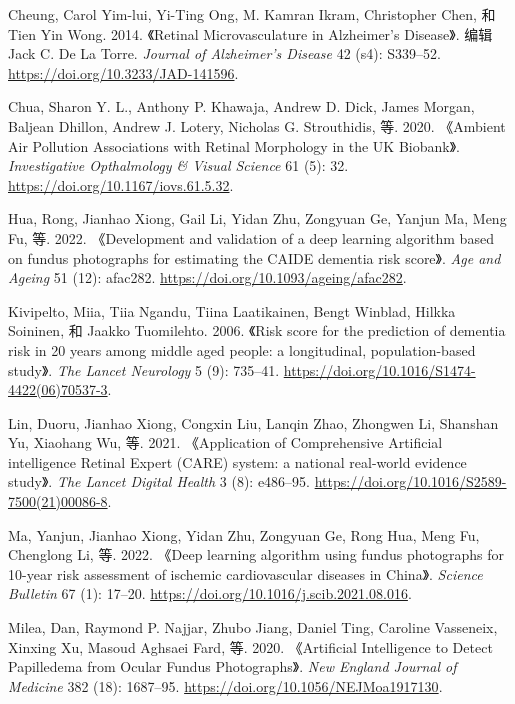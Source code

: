 \documentclass[
  Letterpaper,
]{scrbook}
\newlength{\cslhangindent}
\newenvironment{CSLReferences}[2] %
 {\begin{list}{}{%
  \setlength{\itemindent}{0pt}
  \setlength{\leftmargin}{0pt}
  \setlength{\parsep}{0pt}
  \ifodd #1
   \setlength{\leftmargin}{\cslhangindent}
   \setlength{\itemindent}{-1\cslhangindent}
  \fi
  \setlength{\itemsep}{#2\baselineskip}}}
 {\end{list}}
\begin{document}
\label{refs}
\begin{CSLReferences}{1}{0}
Cheung, Carol Yim-lui, Yi-Ting Ong, M. Kamran Ikram, Christopher Chen,
和 Tien Yin Wong. 2014. {《Retinal {Microvasculature} in {Alzheimer}'s
{Disease}》}. 编辑 Jack C. De La Torre. \emph{Journal of Alzheimer's
Disease} 42 (s4): S339--52. \url{https://doi.org/10.3233/JAD-141596}.

Chua, Sharon Y. L., Anthony P. Khawaja, Andrew D. Dick, James Morgan,
Baljean Dhillon, Andrew J. Lotery, Nicholas G. Strouthidis, 等. 2020.
{《Ambient {Air} {Pollution} {Associations} with {Retinal} {Morphology}
in the {UK} {Biobank}》}. \emph{Investigative Opthalmology \& Visual
Science} 61 (5): 32. \url{https://doi.org/10.1167/iovs.61.5.32}.

Hua, Rong, Jianhao Xiong, Gail Li, Yidan Zhu, Zongyuan Ge, Yanjun Ma,
Meng Fu, 等. 2022. {《Development and validation of a deep learning
algorithm based on fundus photographs for estimating the {CAIDE}
dementia risk score》}. \emph{Age and Ageing} 51 (12): afac282.
\url{https://doi.org/10.1093/ageing/afac282}.

Kivipelto, Miia, Tiia Ngandu, Tiina Laatikainen, Bengt Winblad, Hilkka
Soininen, 和 Jaakko Tuomilehto. 2006. {《Risk score for the prediction
of dementia risk in 20 years among middle aged people: a longitudinal,
population-based study》}. \emph{The Lancet Neurology} 5 (9): 735--41.
\url{https://doi.org/10.1016/S1474-4422(06)70537-3}.

Lin, Duoru, Jianhao Xiong, Congxin Liu, Lanqin Zhao, Zhongwen Li,
Shanshan Yu, Xiaohang Wu, 等. 2021. {《Application of {Comprehensive}
{Artificial} intelligence {Retinal} {Expert} ({CARE}) system: a national
real-world evidence study》}. \emph{The Lancet Digital Health} 3 (8):
e486--95. \url{https://doi.org/10.1016/S2589-7500(21)00086-8}.

Ma, Yanjun, Jianhao Xiong, Yidan Zhu, Zongyuan Ge, Rong Hua, Meng Fu,
Chenglong Li, 等. 2022. {《Deep learning algorithm using fundus
photographs for 10-year risk assessment of ischemic cardiovascular
diseases in {China}》}. \emph{Science Bulletin} 67 (1): 17--20.
\url{https://doi.org/10.1016/j.scib.2021.08.016}.

Milea, Dan, Raymond P. Najjar, Zhubo Jiang, Daniel Ting, Caroline
Vasseneix, Xinxing Xu, Masoud Aghsaei Fard, 等. 2020. {《Artificial
{Intelligence} to {Detect} {Papilledema} from {Ocular} {Fundus}
{Photographs}》}. \emph{New England Journal of Medicine} 382 (18):
1687--95. \url{https://doi.org/10.1056/NEJMoa1917130}.


\end{CSLReferences}
\end{document}
